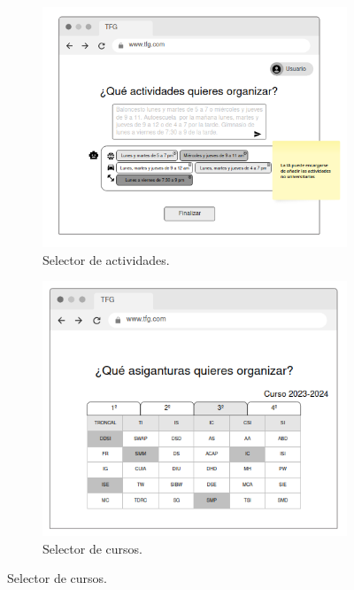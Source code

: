 \begin{figure}[!tb]
    \begin{subfigure}[b]{0.35\textwidth}
        \includegraphics[width=\textwidth]{./imagenes/Mockup_ia.png}
        \caption{Selector de actividades.}
    \end{subfigure}
    \hfill
    \begin{subfigure}[b]{0.35\textwidth}
        \includegraphics[width=\textwidth]{./imagenes/Mockup_cursos.png}
        \caption{Selector de cursos.}
    \end{subfigure}
    

\end{figure}
